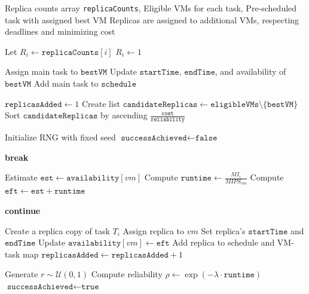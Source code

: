 \documentclass[12pt]{tcc}
\begin{document}
\begin{algorithm}[H]
\caption{Replica Assignment for Scheduled Tasks}
\label{alg:scheduler_with_replica_counts}
\begin{algorithmic}[1]
\Require Replica counts array \texttt{replicaCounts}, Eligible VMs for each task, Pre-scheduled task with assigned best VM
\Ensure Replicas are assigned to additional VMs, respecting deadlines and minimizing cost 

\State Let \( R_i \gets \texttt{replicaCounts}[i] \)
    \State \( R_i \gets 1 \)
\EndIf

\State Assign main task to \( \texttt{bestVM} \)
\State Update \( \texttt{startTime} \), \( \texttt{endTime} \), and availability of \( \texttt{bestVM} \)
\State Add main task to \( \texttt{schedule} \)

\State \( \texttt{replicasAdded} \gets 1 \)
\State Create list \( \texttt{candidateReplicas} \gets \texttt{eligibleVMs} \setminus \{ \texttt{bestVM} \} \)
\State Sort \( \texttt{candidateReplicas} \) by ascending \( \frac{\texttt{cost}}{\texttt{reliability}} \)

\State Initialize RNG with fixed seed
\State \( \texttt{successAchieved} \gets \texttt{false} \)

        \State \textbf{break}
    \EndIf

    \State Estimate \( \texttt{est} \gets \texttt{availability}[vm] \)
    \State Compute \( \texttt{runtime} \gets \frac{MI_i}{MIPS_{vm}} \)
    \State Compute \( \texttt{eft} \gets \texttt{est} + \texttt{runtime} \)

        \State \textbf{continue}
    \EndIf

    \State Create a replica copy of task \( T_i \)
    \State Assign replica to \( vm \)
    \State Set replica's \( \texttt{startTime} \) and \( \texttt{endTime} \)
    \State Update \( \texttt{availability}[vm] \gets \texttt{eft} \)
    \State Add replica to schedule and VM-task map
    \State \( \texttt{replicasAdded} \gets \texttt{replicasAdded} + 1 \)

    \State Generate \( r \sim \mathcal{U}(0, 1) \)
    \State Compute reliability \( \rho \gets \exp(-\lambda \cdot \texttt{runtime}) \)
        \State \( \texttt{successAchieved} \gets \texttt{true} \)
    \EndIf
\EndFor

\end{algorithmic}
\end{algorithm}
\end{document}
